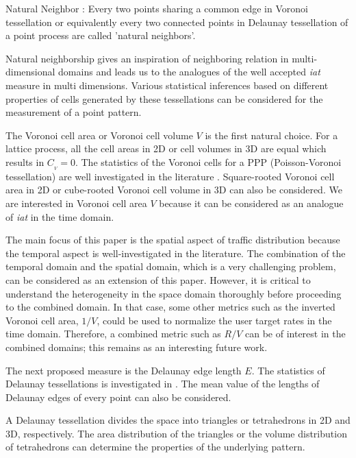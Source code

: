 \documentclass[journal]{IEEEtran}
\begin{document}
\begin{definition}
Natural Neighbor \cite[p.~3]{sirovich2002natural}: Every two points sharing a common edge in Voronoi tessellation or equivalently every two connected points in Delaunay tessellation of a point process are called 'natural neighbors'.
\end{definition}

Natural neighborship gives an inspiration of neighboring relation in multi-dimensional domains and leads us to the analogues of the well accepted \textit{iat} measure in multi dimensions. Various statistical inferences based on different properties of cells generated by these tessellations can be considered for the measurement of a point pattern.

The Voronoi cell area or Voronoi cell volume $V$ is the first natural choice. For a lattice process, all the cell areas in 2D or cell volumes in 3D are equal which results in $C_{_{V}}= 0$. The statistics of the Voronoi cells for a PPP (Poisson-Voronoi tessellation) are well investigated in the literature \cite{barr2008applications,moller2007modern,gilbert1962random,borovkov2007simulation,tanemura2003statistical}. Square-rooted Voronoi cell area in 2D or cube-rooted Voronoi cell volume in 3D can also be considered. We are interested in Voronoi cell area $V$ because it can be considered as an analogue of \textit{iat} in the time domain.

The main focus of this paper is the spatial aspect of traffic distribution because the temporal aspect is well-investigated in the literature. The combination of the temporal domain and the spatial domain, which is a very challenging problem, can be considered as an extension of this paper. However, it is critical to understand the heterogeneity in the space domain thoroughly before proceeding to the combined domain. In that case, some other metrics such as the inverted Voronoi cell area, $1/V$, could be used to normalize the user target rates in the time domain. Therefore, a combined metric such as $R/V$ can be of interest in the combined domains; this remains as an interesting future work.

The next proposed measure is the Delaunay edge length $E$. The statistics of Delaunay tessellations is investigated in \cite{muche1996distributional,rathie1992volume,miles1972random}. The mean value of the lengths of Delaunay edges of every point can also be considered.

A Delaunay tessellation divides the space into triangles or tetrahedrons in 2D and 3D, respectively. The area distribution of the triangles or the volume distribution of tetrahedrons can determine the properties of the underlying pattern. 
\end{document}
